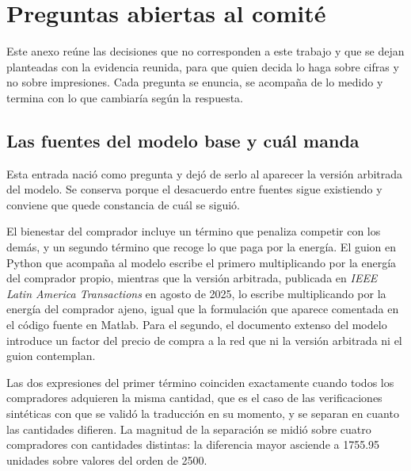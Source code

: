 %
%
\section{Preguntas abiertas al comité}
\label{anx:preg}
\justifying

Este anexo reúne las decisiones que no corresponden a este trabajo y que se
dejan planteadas con la evidencia reunida, para que quien decida lo haga
sobre cifras y no sobre impresiones. Cada pregunta se enuncia, se acompaña
de lo medido y termina con lo que cambiaría según la respuesta.

\subsection{Las fuentes del modelo base y cuál manda}
\label{sub:preg-competencia}

Esta entrada nació como pregunta y dejó de serlo al aparecer la versión
arbitrada del modelo. Se conserva porque el desacuerdo entre fuentes sigue
existiendo y conviene que quede constancia de cuál se siguió.

El bienestar del comprador incluye un término que penaliza competir con los
demás, y un segundo término que recoge lo que paga por la energía. El guion
en Python que acompaña al modelo escribe el primero multiplicando por la
energía del comprador propio, mientras que la versión arbitrada, publicada
en \emph{IEEE Latin America Transactions} en agosto de 2025, lo escribe
multiplicando por la energía del comprador ajeno, igual que la formulación
que aparece comentada en el código fuente en Matlab. Para el segundo, el
documento extenso del modelo introduce un factor del precio de compra a la
red que ni la versión arbitrada ni el guion contemplan.

Las dos expresiones del primer término coinciden exactamente cuando todos
los compradores adquieren la misma cantidad, que es el caso de las
verificaciones sintéticas con que se validó la traducción en su momento, y
se separan en cuanto las cantidades difieren. La magnitud de la separación
se midió sobre cuatro compradores con cantidades distintas: la diferencia
mayor asciende a \num{1755,95} unidades sobre valores del orden de
\num{2500}.

